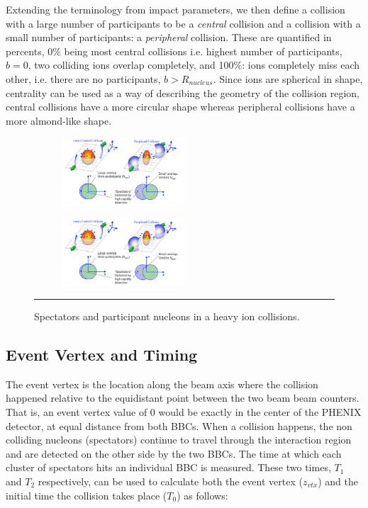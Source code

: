 Extending the terminology from impact parameters, we then define a collision with a large number of participants to be a \textit{central} collision and a collision with a small number of participants: a \textit{peripheral} collision. These are quantified in percents, 0$\%$ being most central collisions i.e. highest number of participants, $b=0$, two colliding ions overlap completely, and 100$\%$: ions completely miss each other, i.e. there are no participants, $b > R_{nucleus}$. Since ions are spherical in shape, centrality can be used as a way of describing the geometry of the collision region, central collisions have a more circular shape whereas peripheral collisions have a more almond-like shape.

\begin{figure}[htbp!]
  \centering
  \begin{subfigure}[b]{0.8\textwidth}
    \includegraphics[width=0.5\textwidth]{Figures/centralvsperipheral.jpg}
    \end{subfigure}
    \begin{subfigure}[b]{0.8\textwidth}
    \includegraphics[width=0.5\textwidth]{Figures/centralvsperipheral.jpg}
    \end{subfigure}
    \rule{35em}{0.5pt}
  \caption[Central versus peripheral ion collisions]{Spectators and participant nucleons in a heavy ion collisions.}
  \label{fig:centralvsperipheral}
\end{figure}

\subsection{Event Vertex and Timing}
The event vertex is the location along the beam axis where the collision happened relative to the equidistant point between the two beam beam counters. That is, an event vertex value of 0 would be exactly in the center of the PHENIX detector, at equal distance from both BBCs. When a collision happens, the non colliding nucleons (spectators) continue to travel through the interaction region and are detected on the other side by the two BBCs. The time at which each cluster of spectators hits an individual BBC is measured. These two times, $T_1$ and $T_2$ respectively, can be used to calculate both the event vertex ($z_{vtx}$) and the initial time the collision takes place ($T_0$) as follows\citep{Mitchell:2002wu}:

